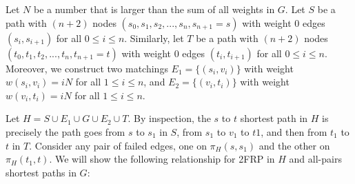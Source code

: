 \documentclass[11pt]{article}
\theoremstyle{plain}
\theoremstyle{definition}
\newcommand{\set}[1]{\{ #1 \}}
\begin{document}
Let $N$ be a number that is larger than the sum of all weights in $G$. Let $S$ be a path with $(n+2)$ nodes {$(s_0,s_1,s_2,...,s_n,s_{n+1}=s)$} with weight 0 edges $(s_i,s_{i+1})$ for all $0 \leq i \leq n$. Similarly, let $T$ be a path with $(n+2)$ nodes $(t_0,t_1,t_2,...,t_n,t_{n+1}=t)$ with weight 0 edges $(t_i,t_{i+1})$ for all $0 \leq i \leq n$. Moreover, we construct two matchings $E_1 = \set{(s_i,v_i)}$ with weight $w(s_i,v_i)=iN$ for all $1 \leq i \leq n$, and $E_2 = \set{(v_i,t_i)}$ with weight $w(v_i,t_i)=iN$ for all $1 \leq i \leq n$.

Let {$H=S \cup E_1 \cup G \cup E_2 \cup T$}. By inspection, the $s$ to $t$ shortest path in $H$ is precisely the path goes from $s$ to $s_1$ in $S$, from $s_1$ to $v_1$ to $t1$, and then from $t_1$ to $t$ in $T$. Consider any pair of failed edges, one on $\pi_H(s,s_1)$ and the other on $\pi_H(t_1,t)$. We will show the following relationship for 2FRP in $H$ and all-pairs shortest paths in $G$:
\end{document}
